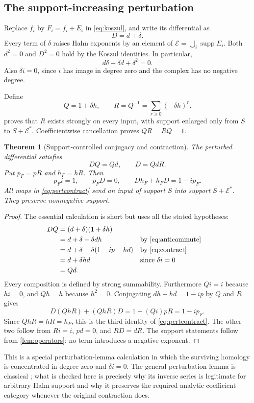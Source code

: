 \documentclass[11pt,letterpaper]{article}
\newtheorem{theorem}{Theorem}[section]
\theoremstyle{definition}
\theoremstyle{remark}
\newcommand{\EE}{\mathcal E}
\newcommand{\supp}{\operatorname{supp}}
\numberwithin{equation}{section}
\begin{document}
\subsection{The support-increasing perturbation}
Replace $f_i$ by $F_i=f_i+E_i$ in \eqref{eq:koszul}, and write its differential as
\[
 D=d+\delta.
\]
Every term of $\delta$ raises Hahn exponents by an element of $\EE=\bigcup_i\supp E_i$. Both $d^2=0$ and $D^2=0$ hold by the Koszul identities. In particular,
\begin{equation}\label{eq:anticommute}
 d\delta+\delta d+\delta^2=0.
\end{equation}
Also $\delta i=0$, since $i$ has image in degree zero and the complex has no negative degree.

Define
\begin{equation}\label{eq:QR}
 Q=1+\delta h,\qquad
 R=Q^{-1}=\sum_{r\geq0}(-\delta h)^r.
\end{equation}
 proves that $R$ exists strongly on every input, with support enlarged only from $S$ to $S+\EE^*$. Coefficientwise cancellation proves $QR=RQ=1$.

\begin{theorem}[Support-controlled conjugacy and contraction]\label{thm:conjugacy}
The perturbed differential satisfies
\begin{equation}\label{eq:conjugacy}
 DQ=Qd,\qquad D=QdR.
\end{equation}
Put $p_F=pR$ and $h_F=hR$. Then
\begin{equation}\label{eq:pertcontract}
 p_Fi=1,\qquad p_FD=0,\qquad
 Dh_F+h_FD=1-ip_F.
\end{equation}
All maps in \eqref{eq:pertcontract} send an input of support $S$ into support $S+\EE^*$. They preserve nonnegative support.
\end{theorem}
\begin{proof}
The essential calculation is short but uses all the stated hypotheses:
\begin{align*}
 DQ
 &=(d+\delta)(1+\delta h)\\
 &=d+\delta-\delta dh &&\text{by \eqref{eq:anticommute}}\\
 &=d+\delta-\delta(1-ip-hd) &&\text{by \eqref{eq:contract}}\\
 &=d+\delta hd &&\text{since }\delta i=0\\
 &=Qd.
\end{align*}
Every composition is defined by strong summability. Furthermore $Qi=i$ because $hi=0$, and $Qh=h$ because $h^2=0$. Conjugating $dh+hd=1-ip$ by $Q$ and $R$ gives
\[
 D(QhR)+(QhR)D=1-(Qi)pR=1-ip_F.
\]
Since $QhR=hR=h_F$, this is the third identity of \eqref{eq:pertcontract}. The other two follow from $Ri=i$, $pd=0$, and $RD=dR$. The support statements follow from \cref{lem:operators}; no term introduces a negative exponent.
\end{proof}
This is a special perturbation-lemma calculation in which the surviving homology is concentrated in degree zero and $\delta i=0$. The general perturbation lemma is classical \cite{Crainic}; what is checked here is precisely why its inverse series is legitimate for arbitrary Hahn support and why it preserves the required analytic coefficient category whenever the original contraction does.
\end{document}
